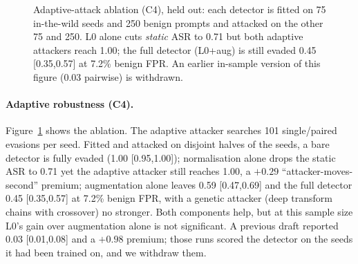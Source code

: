\documentclass[11pt]{article}
\begin{document}
\begin{figure}[t]
\centering
{}
\caption{Adaptive-attack ablation (C4), held out: each detector is fitted on 75 in-the-wild seeds and 250
benign prompts and attacked on the other 75 and 250. L0 alone cuts \emph{static} ASR to 0.71 but both
adaptive attackers reach 1.00; the full detector (L0+aug) is still evaded 0.45 [0.35,0.57] at 7.2\%
benign FPR. An earlier in-sample version of this figure (0.03 pairwise) is withdrawn.}
\label{fig:adaptive}
\end{figure}

\paragraph{Adaptive robustness (C4).} Figure~\ref{fig:adaptive} shows the ablation. The adaptive attacker
searches 101 single/paired evasions per seed. Fitted and attacked on disjoint halves of the seeds, a
bare detector is fully evaded (1.00 [0.95,1.00]); normalisation alone drops the static ASR to 0.71 yet the
adaptive attacker still reaches 1.00, a $+0.29$ ``attacker-moves-second'' premium; augmentation alone
leaves 0.59 [0.47,0.69] and the full detector 0.45 [0.35,0.57] at 7.2\% benign FPR, with a genetic
attacker (deep transform chains with crossover) no stronger. Both components help, but at this sample
size L0's gain over augmentation alone is not significant. A previous draft reported 0.03 [0.01,0.08]
and a $+0.98$ premium; those runs scored the detector on the seeds it had been trained on, and we
withdraw them.
\end{document}
